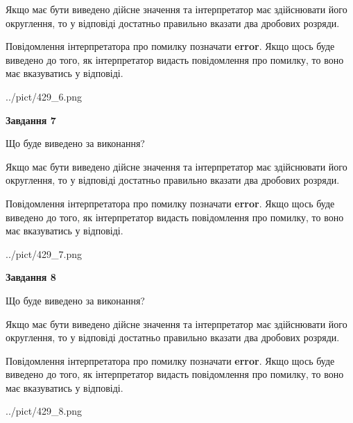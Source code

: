 \documentclass[12pt, ukrainian]{article}
\begin{document}
{\begin {Large}
Якщо має бути виведено дійсне значення та інтерпретатор має здійснювати його округлення, 
то у відповіді достатньо правильно вказати два дробових розряди.

Повідомлення інтерпретатора про помилку позначати \textbf{error}.
Якщо щось буде виведено до того, як інтерпретатор видасть повідомлення про помилку, 
то воно має вказуватись у відповіді. \par

\begin{center}
	{../pict/429_6.png}
\end{center}
\newpage

{\begin {center}\textbf{Завдання 7}\end {center}}\par
Що буде виведено за виконання? \par

Якщо має бути виведено дійсне значення та інтерпретатор має здійснювати його округлення, 
то у відповіді достатньо правильно вказати два дробових розряди.

Повідомлення інтерпретатора про помилку позначати \textbf{error}.
Якщо щось буде виведено до того, як інтерпретатор видасть повідомлення про помилку, 
то воно має вказуватись у відповіді. \par

\begin{center}
	{../pict/429_7.png}
\end{center}
\newpage

{\begin {center}\textbf{Завдання 8}\end {center}}\par
Що буде виведено за виконання? \par

Якщо має бути виведено дійсне значення та інтерпретатор має здійснювати його округлення, 
то у відповіді достатньо правильно вказати два дробових розряди.

Повідомлення інтерпретатора про помилку позначати \textbf{error}.
Якщо щось буде виведено до того, як інтерпретатор видасть повідомлення про помилку, 
то воно має вказуватись у відповіді. \par

\begin{center}
	{../pict/429_8.png}
\end{center}
\newpage


\end{Large}}
\end{document}
